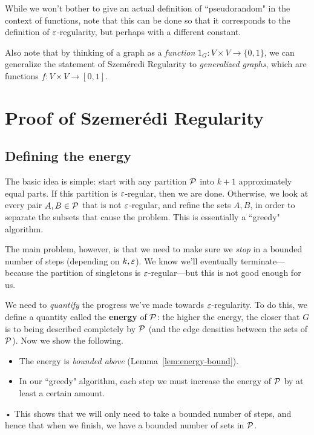 
While we won't bother to give an actual definition of ``pseudorandom" in the context of functions, note that this can be done so that it corresponds to the definition of $\ep$-regularity, but perhaps with a different constant.

Also note that by thinking of a graph as a {\it function} $1_G:V\times V\to \{0,1\}$, we can generalize the statement of Szem\'eredi Regularity to {\it generalized graphs}, which are functions $f:V\times V\to [0,1]$.

\section{Proof of Szemer\'edi Regularity}
\subsection{Defining the energy}
The basic idea is simple: start with any partition $\cal P$ into $k+1$ approximately equal parts. If this partition is $\ep$-regular, then we are done. Otherwise, we look at every pair $A,B\in \cal P$ that is not $\ep$-regular, and refine the sets $A,B$, in order to separate the subsets that cause the problem. This is essentially a ``greedy" algorithm.

The main problem, however, is that we need to make sure we {\it stop} in a bounded number of steps (depending on $k,\ep$). We know we'll eventually terminate---because the partition of singletons is $\ep$-regular---but this is not good enough for us.

We need to {\it quantify} the progress we've made towards $\ep$-regularity. To do this, we define a quantity called the \textbf{energy} of $\cal P$: the higher the energy, the closer that $G$ is to being described completely by $\cal P$ (and the edge densities between the sets of $\cal P$). Now we show the following.
\begin{itemize}
\item
The energy is \emph{bounded above} (Lemma~\ref{lem:energy-bound}).
\item
In our ``greedy" algorithm, each step we must increase the energy of $\cal P$ by at least a certain amount.
\end{itemize}•
This shows that we will only need to take a bounded number of steps, and hence that when we finish, we have a bounded number of sets in $\cal P$.

